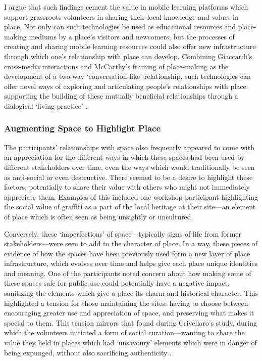 I argue that such findings cement the value in mobile learning platforms which support grassroots volunteers in sharing their local knowledge and values in place. Not only can such technologies be used as educational resources and place-making mediums by a place's visitors and newcomers, but the processes of creating and sharing mobile learning resources could also offer new infrastructure through which one's relationship with place can develop. Combining Giaccardi's cross-media interactions and McCarthy's framing of place-making as the development of a two-way `conversation-like' relationship, such technologies can offer novel ways of exploring and articulating people's relationships with place: supporting the building of these mutually beneficial relationships through a dialogical `living practice' \citep{Giaccardi2008, McCarthy2005}. 

\subsubsection{Augmenting Space to Highlight Place}

The participants' relationships with space also frequently appeared to come with an appreciation for the different ways in which these spaces had been used by different stakeholders over time, even the ways which would traditionally be seen as anti-social or even destructive. There seemed to be a desire to highlight these factors, potentially to share their value with others who might not immediately appreciate them. Examples of this included one workshop participant highlighting the social value of graffiti as a part of the local heritage at their site---an element of place which is often seen as being unsightly or uncultured. 

Conversely, these `imperfections' of space---typically signs of life from former stakeholders---were seen to add to the character of place. In a way, these pieces of evidence of how the spaces have been previously used form a new layer of place infrastructure, which evolves over time and helps give each place unique identities and meaning. One of the participants noted concern about how making some of these spaces safe for public use could potentially have a negative impact, sanitizing the elements which give a place its charm and historical character. This highlighted a tension for those maintaining the sites: having to choose between encouraging greater use and appreciation of space, and preserving what makes it special to them. This tension mirrors that found during Crivellaro's study, during which the volunteers initiated a form of social curation---wanting to share the value they held in places which had `unsavoury' elements which were in danger of being expunged, without also sacrificing authenticity \citep{Crivellaro2016}.

